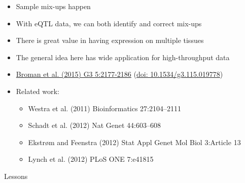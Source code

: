 \documentclass[12pt]{article}
\newcommand{\headsize}{\fontsize{35}{35} \selectfont}
\newcommand{\smallersize}{\fontsize{20}{25} \selectfont}
\newcommand{\smallestsize}{\fontsize{18}{22} \selectfont}
\begin{document}
\vspace{3cm} \color{mywhite} \smallersize

\hfill \begin{minipage}{10in}

\begin{itemize}
\itemsep24pt

\item Sample mix-ups happen


\item With eQTL data, we can both identify and {\color{mypink}
  correct} mix-ups

\item There is great value in having expression on multiple tissues

\item The general idea here has wide application for high-throughput data

\item \href{https://www.ncbi.nlm.nih.gov/pubmed/26290572}{Broman et al. (2015) G3 5:2177-2186}
(\href{http://doi.org/10.1534/g3.115.019778}{doi: 10.1534/g3.115.019778})

\item Related work:

\smallestsize \color{myblue}
\begin{itemize}
\item Westra et al. (2011) Bioinformatics 27:2104--2111
\item Schadt et al. (2012) Nat Genet 44:603--608
\item Ekstr{\o}m and Feenstra (2012) Stat Appl Genet Mol Biol
  3:Article 13
\item Lynch et al. (2012) PLoS ONE 7:e41815
\end{itemize}

\end{itemize}
\end{minipage}



\newpage

\headsize \color{myyellow}
\hfill \begin{minipage}{5.75in}
\centering
Lessons
\end{minipage}

\vspace{20mm} \color{mywhite} \smallersize
\end{document}
